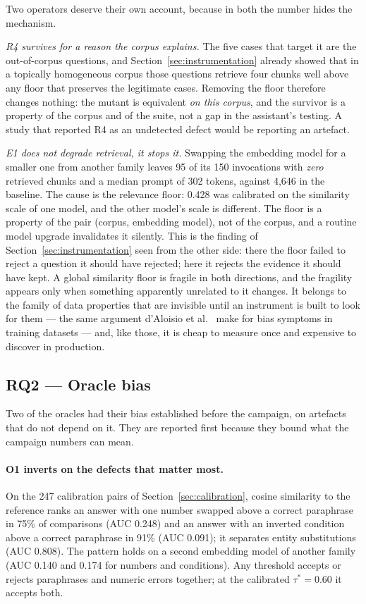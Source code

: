\documentclass[a4paper,fleqn]{cas-dc}
\begin{document}
Two operators deserve their own account, because in both the number hides the
mechanism.

\emph{R4 survives for a reason the corpus explains.} The five cases that target
it are the out-of-corpus questions, and Section~\ref{sec:instrumentation}
already showed that in a topically homogeneous corpus those questions retrieve
four chunks well above any floor that preserves the legitimate cases. Removing
the floor therefore changes nothing: the mutant is equivalent \emph{on this
corpus}, and the survivor is a property of the corpus and of the suite, not a
gap in the assistant's testing. A study that reported R4 as an undetected
defect would be reporting an artefact.

\emph{E1 does not degrade retrieval, it stops it.} Swapping the embedding model
for a smaller one from another family leaves 95 of its 150 invocations with
\emph{zero} retrieved chunks and a median prompt of 302 tokens, against 4,646
in the baseline. The cause is the relevance floor: 0.428 was calibrated on the
similarity scale of one model, and the other model's scale is different. The
floor is a property of the pair (corpus, embedding model), not of the corpus,
and a routine model upgrade invalidates it silently. This is the finding of
Section~\ref{sec:instrumentation} seen from the other side: there the floor
failed to reject a question it should have rejected; here it rejects the
evidence it should have kept. A global similarity floor is fragile in both
directions, and the fragility appears only when something apparently unrelated
to it changes. It belongs to the family of data properties that are invisible
until an instrument is built to look for them --- the same argument
d'Aloisio et al.~\cite{daloisio2025bias} make for bias symptoms in training
datasets --- and, like those, it is cheap to measure once and expensive to
discover in production.

\subsection{RQ2 --- Oracle bias}
\label{sec:rq2}

Two of the oracles had their bias established before the campaign, on artefacts
that do not depend on it. They are reported first because they bound what the
campaign numbers can mean.

\paragraph{O1 inverts on the defects that matter most.} On the 247 calibration
pairs of Section~\ref{sec:calibration}, cosine similarity to the reference
ranks an answer with one number swapped above a correct paraphrase in 75\% of
comparisons (AUC 0.248) and an answer with an inverted condition above a
correct paraphrase in 91\% (AUC 0.091); it separates entity substitutions
(AUC 0.808). The pattern holds on a second embedding model of another family
(AUC 0.140 and 0.174 for numbers and conditions). Any threshold accepts or
rejects paraphrases and numeric errors together; at the calibrated
$\tau^\ast = 0.60$ it accepts both.
\end{document}
